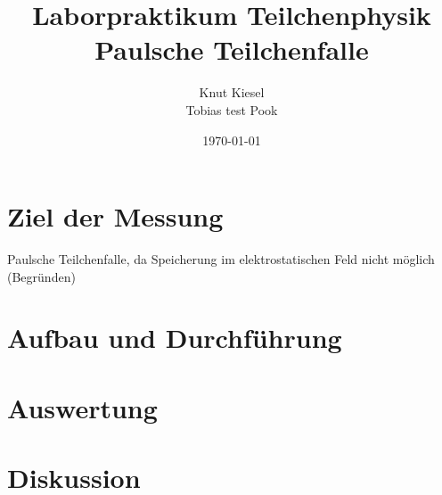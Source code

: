 \documentclass[a4paper,12pt]{article}
\title{Laborpraktikum Teilchenphysik\\ Paulsche Teilchenfalle}
\author{Knut Kiesel\\Tobias test Pook}
\date{\today}
\begin{document}
\maketitle
\thispagestyle{empty}
\newpage
\tableofcontents
\setcounter{page}{1}
\newpage

\section{Ziel der Messung} %
Paulsche Teilchenfalle, da Speicherung im elektrostatischen Feld nicht möglich (Begründen)


\section{Aufbau und Durchführung}


\section{Auswertung}
\section{Diskussion}

\begin{figure}[htb]
		\centering
		\label{fig:lhc}
\end{figure}
\FloatBarrier








\end{document}
